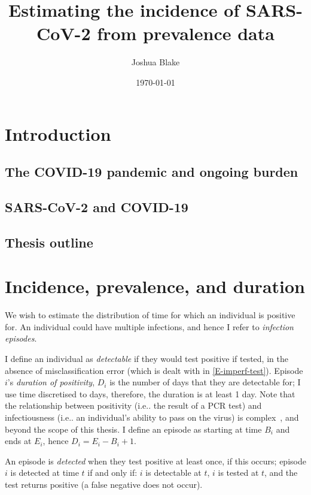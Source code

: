 \documentclass{cam-thesis}
\title{Estimating the incidence of SARS-CoV-2 from prevalence data}
\author{Joshua Blake}
\date{\today}
\makeatletter
\DeclareRobustCommand\onedot{\futurelet\@let@token\@onedot}
\def\@onedot{\ifx\@let@token.\else.\null\fi\xspace}
\def\ie{i.e\onedot} \def\Ie{\emph{I.e}\onedot}
\makeatother
\begin{document}
\frontmatter{}

\listoffigures

\chapter{Introduction} \label{intro}

\section{The COVID-19 pandemic and ongoing burden}

\section{SARS-CoV-2 and COVID-19}

\section{Thesis outline}

\chapter{Incidence, prevalence, and duration}
We wish to estimate the distribution of time for which an individual is positive for.
An individual could have multiple infections, and hence I refer to \emph{infection episodes}.

I define an individual as \emph{detectable} if they would test positive if tested, in the absence of misclassification error (which is dealt with in \cref{E-imperf-test}).
Episode $i$'s \emph{duration of positivity}, $D_i$ is the number of days that they are detectable for; I use time discretised to days, therefore, the duration is at least 1 day.
Note that the relationship between positivity (\ie the result of a PCR test) and infectiousness (\ie an individual's ability to pass on the virus) is complex~\autocites{lascolaViral}{singanayagamDuration}, and beyond the scope of this thesis.
I define an episode as starting at time $B_i$ and ends at $E_i$, hence $D_i = E_i - B_i + 1$.

An episode is \emph{detected} when they test positive at least once, if this occurs; episode $i$ is detected at time $t$ if and only if: $i$ is detectable at $t$, $i$ is tested at $t$, and the test returns positive (a false negative does not occur).
\end{document}
